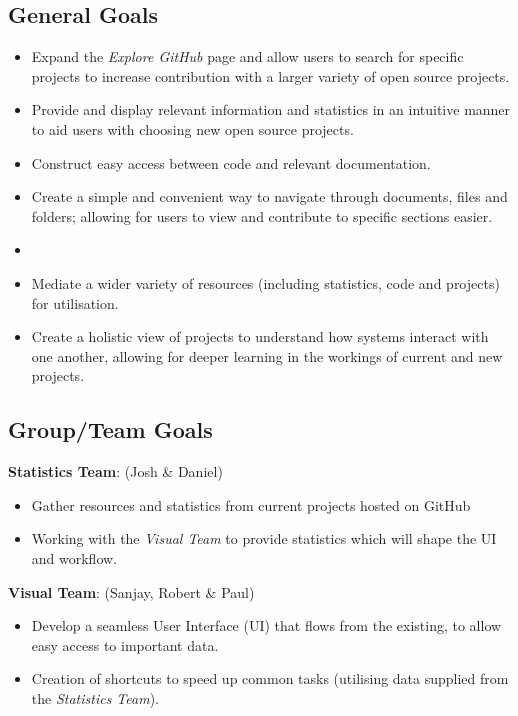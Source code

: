\documentclass[12pt]{article}
\begin{document}
\subsection{General Goals}
\begin{itemize}
\item Expand the \emph{Explore GitHub} page and allow users to search for specific projects to increase contribution with a larger variety of open source projects.
\item Provide and display relevant information and statistics in an intuitive manner to aid users with choosing new open source projects.
\item Construct easy access between code and relevant documentation.
\item Create a simple and convenient way to navigate through documents, files and folders; allowing for users to view and contribute to specific sections easier.
\item 
\item Mediate a wider variety of resources (including statistics, code and projects) for utilisation.
\item Create a holistic view of projects to understand how systems interact with one another, allowing for deeper learning in the workings of current and new projects.
\end{itemize}
\subsection{Group/Team Goals}
\textbf{Statistics Team}: (Josh \& Daniel)
\begin{itemize}
\item Gather resources and statistics from current projects hosted on GitHub
\item Working with the \emph{Visual Team} to provide statistics which will shape the UI and workflow.
\end{itemize}
\textbf{Visual Team}: (Sanjay, Robert \& Paul)
\begin{itemize}
\item Develop a seamless User Interface (UI) that flows from the existing, to allow easy access to important data.
\item Creation of shortcuts to speed up common tasks (utilising data supplied from the \emph{Statistics Team}).
\end{itemize}
\end{document}
